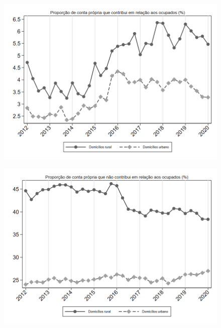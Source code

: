 \begin{frame}[label=_composicao_demografica_rural_urbano_prop_cpropriaC]{}
\textit{\hyperlink{_composicao_demografica_rural_urbano}{}}
\begin{figure}
  \centering
  \includegraphics[width=1.0\linewidth]{../../analysis/output/composicao_demografica/area_geografica/_composicao_demografica_rural_urbano_prop_cpropriaC.png}
  \caption{}
  \label{fig:_composicao_demografica_rural_urbano_prop_cpropriaC}
\end{figure}
\end{frame}

\begin{frame}[label=_composicao_demografica_rural_urbano_prop_cpropriaNc]{}
\textit{\hyperlink{_composicao_demografica_rural_urbano}{}}
\begin{figure}
  \centering
  \includegraphics[width=1.0\linewidth]{../../analysis/output/composicao_demografica/area_geografica/_composicao_demografica_rural_urbano_prop_cpropriaNc.png}
  \caption{}
  \label{fig:_composicao_demografica_rural_urbano_prop_cpropriaNc}
\end{figure}
\end{frame}